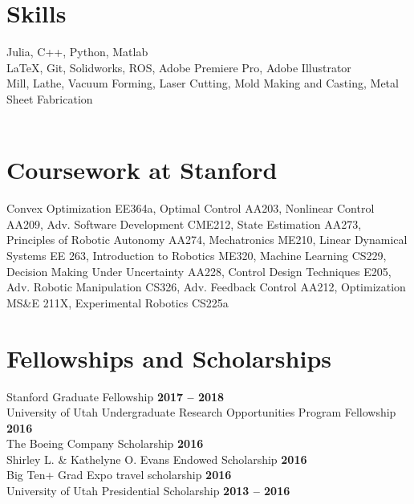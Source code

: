 \documentclass[margin,line]{res}
\begin{document}
\begin{resume}
\section{\sc Skills}
Julia, C++, Python, Matlab\\
\LaTeX, Git, Solidworks, ROS, Adobe Premiere Pro, Adobe Illustrator \\
Mill, Lathe, Vacuum Forming, Laser Cutting, Mold Making and Casting, Metal Sheet Fabrication\\
\\
\section{\sc Coursework at Stanford}
Convex Optimization EE364a, Optimal Control AA203, Nonlinear Control AA209, Adv. Software Development CME212, State Estimation AA273, Principles of Robotic Autonomy AA274, Mechatronics ME210, Linear Dynamical Systems EE 263, Introduction to Robotics ME320, Machine Learning CS229, Decision Making Under Uncertainty AA228, Control Design Techniques E205, Adv. Robotic Manipulation CS326, Adv. Feedback Control AA212, Optimization MS\&E 211X, Experimental Robotics CS225a
\\

\section{\sc Fellowships and Scholarships}
 Stanford Graduate Fellowship \hfill {\bf 2017 – 2018}\\
University of Utah Undergraduate Research Opportunities Program Fellowship \hfill {\bf 2016}\\
The Boeing Company Scholarship \hfill {\bf 2016}\\
Shirley L. \& Kathelyne O. Evans Endowed Scholarship \hfill {\bf 2016}\\
Big Ten+ Grad Expo travel scholarship \hfill {\bf 2016}\\
University of Utah Presidential Scholarship \hfill {\bf 2013 – 2016}
\\


\end{resume}
\end{document}
